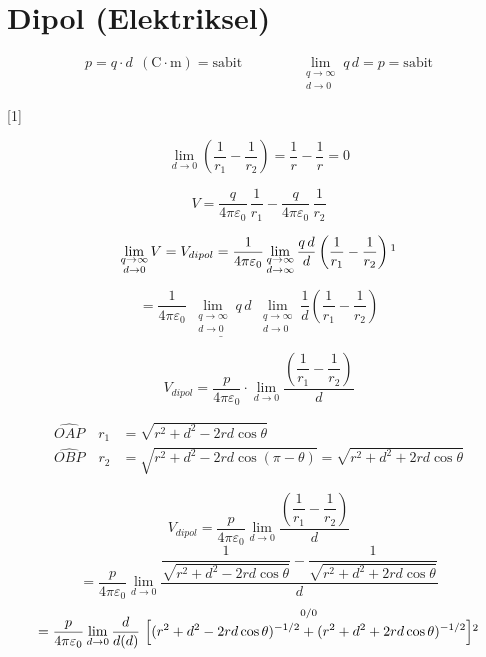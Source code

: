 \documentclass[11pt,a4paper]{article}
\begin{document}

\section{Dipol (Elektriksel)}

\[
p=q\cdot d\ \ (\mathrm{C\cdot m})=\text{sabit}
\qquad\qquad
\lim_{\substack{q\to\infty\\ d\to 0}} q\,d=p=\text{sabit}
\]

[1]

\[
\lim_{d\to 0}\left(\frac{1}{r_1}-\frac{1}{r_2}\right)=\frac{1}{r}-\frac{1}{r}=0
\]

\[
V=\frac{q}{4\pi\varepsilon_0}\,\frac{1}{r_1}-\frac{q}{4\pi\varepsilon_0}\,\frac{1}{r_2}
\]

\[
\lim_{\substack{q\to\infty\\ d\to 0}}V=V_{dipol}=\frac{1}{4\pi\varepsilon_0}\lim_{\substack{q\to\infty\\ d\to\infty}}\frac{q\,d}{d}\left(\frac{1}{r_1}-\frac{1}{r_2}\right)\footnotemark
\]

\[
=\frac{1}{4\pi\varepsilon_0}\;\underline{\lim_{\substack{q\to\infty\\ d\to 0}}q\,d}\;\lim_{\substack{q\to\infty\\ d\to 0}}\frac{1}{d}\left(\frac{1}{r_1}-\frac{1}{r_2}\right)
\]

\[
V_{dipol}=\frac{p}{4\pi\varepsilon_0}\cdot\lim_{d\to 0}\frac{\left(\dfrac{1}{r_1}-\dfrac{1}{r_2}\right)}{d}
\]

\begin{align*}
\widehat{OAP}\quad r_1&=\sqrt{r^2+d^2-2rd\cos\theta}\\
\widehat{OBP}\quad r_2&=\sqrt{r^2+d^2-2rd\cos(\pi-\theta)}=\sqrt{r^2+d^2+2rd\cos\theta}
\end{align*}

\[
V_{dipol}=\frac{p}{4\pi\varepsilon_0}\lim_{d\to 0}\frac{\left(\dfrac{1}{r_1}-\dfrac{1}{r_2}\right)}{d}
\]
\[
=\frac{p}{4\pi\varepsilon_0}\lim_{d\to 0}\frac{\dfrac{1}{\sqrt{r^2+d^2-2rd\cos\theta}}-\dfrac{1}{\sqrt{r^2+d^2+2rd\cos\theta}}}{d}
\]
\[
=\frac{p}{4\pi\varepsilon_0}\lim_{d\to 0}\frac{d}{d(d)}\ \overset{0/0}{\Bigl[(r^2+d^2-2rd\cos\theta)^{-1/2}+(r^2+d^2+2rd\cos\theta)^{-1/2}\Bigr]}\footnotemark
\]
\end{document}
